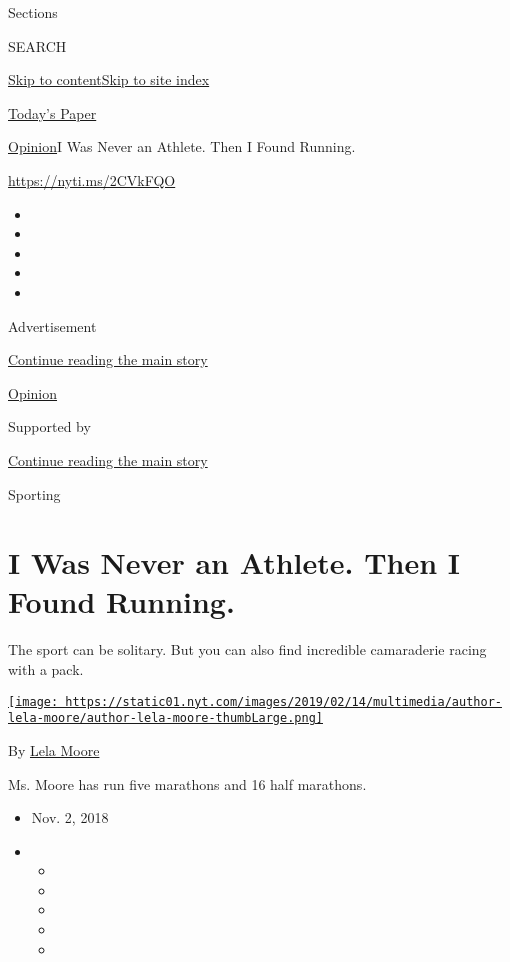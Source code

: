 Sections

SEARCH

\protect\hyperlink{site-content}{Skip to
content}\protect\hyperlink{site-index}{Skip to site index}

\href{https://myaccount.nytimes.com/auth/login?response_type=cookie\&client_id=vi}{}

\href{https://www.nytimes.com/section/todayspaper}{Today's Paper}

\href{/section/opinion}{Opinion}\textbar{}I Was Never an Athlete. Then I
Found Running.

\href{https://nyti.ms/2CVkFQO}{https://nyti.ms/2CVkFQO}

\begin{itemize}
\item
\item
\item
\item
\item
\end{itemize}

Advertisement

\protect\hyperlink{after-top}{Continue reading the main story}

\href{/section/opinion}{Opinion}

Supported by

\protect\hyperlink{after-sponsor}{Continue reading the main story}

Sporting

\hypertarget{i-was-never-an-athlete-then-i-found-running}{%
\section{I Was Never an Athlete. Then I Found
Running.}\label{i-was-never-an-athlete-then-i-found-running}}

The sport can be solitary. But you can also find incredible camaraderie
racing with a pack.

\href{https://www.nytimes.com/by/lela-moore}{\texttt{[image: https://static01.nyt.com/images/2019/02/14/multimedia/author-lela-moore/author-lela-moore-thumbLarge.png]}}

By \href{https://www.nytimes.com/by/lela-moore}{Lela Moore}

Ms. Moore has run five marathons and 16 half marathons.

\begin{itemize}
\item
  Nov. 2, 2018
\item
  \begin{itemize}
  \item
  \item
  \item
  \item
  \item
  \end{itemize}
\end{itemize}

